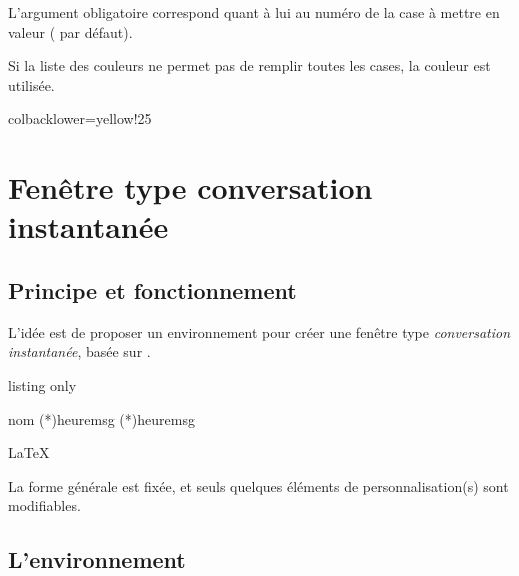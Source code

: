 \documentclass[french,11pt,a4paper]{article}
\begin{document}
L'argument obligatoire correspond quant à lui au numéro de la case à mettre en valeur ( par défaut).

\smallskip

Si la liste des couleurs ne permet pas de remplir toutes les cases, la couleur  est utilisée.

\begin{DemoCode}{}
\end{DemoCode}

\begin{DemoCode}{colbacklower=yellow!25}
\def\lstcouleurs{couleurNS1,couleurNS2,couleurNS3,couleurNS4,couleurNS5,purple}
\BandeauScore%
	[EchelleSymboles={1.33,2},Hauteur=2,AffLegende=false,
	Symboles={1,2,3,4,5,6},Couleurs=\lstcouleurs,
	CouleurFond=yellow!25]{1}
\end{DemoCode}

\pagebreak

\section{Fenêtre type conversation instantanée}

\subsection{Principe et fonctionnement}

L'idée est de proposer un environnement pour créer une fenêtre type \textit{conversation instantanée}, basée sur .

\begin{DemoCode}{listing only}
\begin{EnvSMS}[Clés]{nom}
  \SMSrec(*){heure}{msg}
  \SMSenv(*){heure}{msg}
\end{EnvSMS}
\end{DemoCode}

\begin{DemoCode}{}
\begin{EnvSMS}{\LaTeX}
\end{EnvSMS}
\end{DemoCode}

La forme générale est fixée, et seuls quelques éléments de personnalisation(s) sont modifiables.

\subsection{L'environnement}
\end{document}

